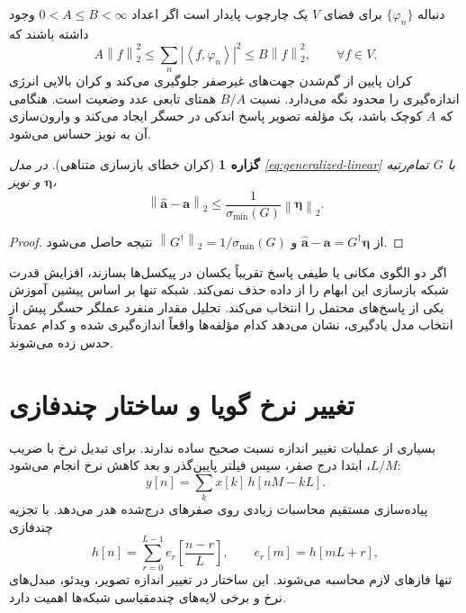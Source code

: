 \documentclass[12pt,openany,oneside]{book}
\newtheorem{proposition}{گزاره}[chapter]
\newcommand{\norm}[1]{\left\lVert #1\right\rVert}
\newcommand{\abs}[1]{\left\lvert #1\right\rvert}
\newcommand{\inner}[2]{\left\langle #1,#2\right\rangle}
\newcommand{\vect}[1]{\bm{#1}}
\begin{document}
دنباله \(\{\varphi_n\}\) برای فضای \(V\) یک چارچوب پایدار است اگر اعداد
\(0<A\le B<\infty\) وجود داشته باشند که
\begin{equation}
A\norm{f}_2^2\le
\sum_n\abs{\inner{f}{\varphi_n}}^2
\le B\norm{f}_2^2,
\qquad\forall f\in V.
\label{eq:frame-bounds}
\end{equation}
کران پایین از گم‌شدن جهت‌های غیرصفر جلوگیری می‌کند و کران بالایی انرژی اندازه‌گیری را محدود نگه
می‌دارد. نسبت \(B/A\) همتای تابعی عدد وضعیت است. هنگامی که \(A\) کوچک باشد، یک مؤلفه تصویر
پاسخ اندکی در حسگر ایجاد می‌کند و وارون‌سازی آن به نویز حساس می‌شود.

\begin{proposition}[کران خطای بازسازی متناهی]
در مدل \eqref{eq:generalized-linear} با \(G\) تمام‌رتبه و نویز \(\vect\eta\)،
\begin{equation}
\norm{\widehat{\vect a}-\vect a}_2
\le\frac{1}{\sigma_{\min}(G)}\norm{\vect\eta}_2.
\end{equation}
\end{proposition}

\begin{proof}
از \(\widehat{\vect a}-\vect a=G^\dagger\vect\eta\) و
\(\norm{G^\dagger}_2=1/\sigma_{\min}(G)\) نتیجه حاصل می‌شود.
\end{proof}

\begin{keybox}
اگر دو الگوی مکانی یا طیفی پاسخ تقریباً یکسان در پیکسل‌ها بسازند، افزایش قدرت شبکه بازسازی این
ابهام را از داده حذف نمی‌کند. شبکه تنها بر اساس پیشین آموزش یکی از پاسخ‌های محتمل را انتخاب می‌کند.
تحلیل مقدار منفرد عملگر حسگر پیش از انتخاب مدل یادگیری، نشان می‌دهد کدام مؤلفه‌ها واقعاً اندازه‌گیری
شده و کدام عمدتاً حدس زده می‌شوند.
\end{keybox}

\section{تغییر نرخ گویا و ساختار چندفازی}

بسیاری از عملیات تغییر اندازه نسبت صحیح ساده ندارند. برای تبدیل نرخ با ضریب \(L/M\)، ابتدا
درج صفر، سپس فیلتر پایین‌گذر و بعد کاهش نرخ انجام می‌شود:
\begin{equation}
y[n]=\sum_k x[k]\,h[nM-kL].
\label{eq:rational-resampling}
\end{equation}
پیاده‌سازی مستقیم محاسبات زیادی روی صفرهای درج‌شده هدر می‌دهد. با تجزیه چندفازی
\begin{equation}
h[n]=\sum_{r=0}^{L-1}e_r\!\left[\frac{n-r}{L}\right],
\qquad e_r[m]=h[mL+r],
\end{equation}
تنها فازهای لازم محاسبه می‌شوند. این ساختار در تغییر اندازه تصویر، ویدئو، مبدل‌های نرخ و برخی
لایه‌های چندمقیاسی شبکه‌ها اهمیت دارد.
\end{document}
